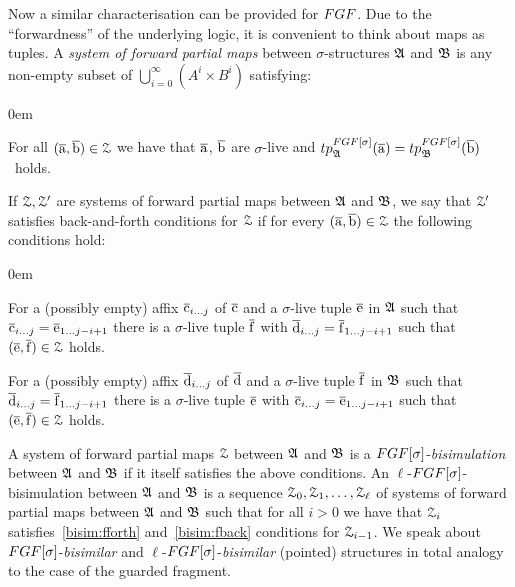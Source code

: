 Now a similar characterisation can be provided for $\FGF$. 
Due to the ``forwardness'' of the underlying logic, it is convenient to think about maps as tuples.
A \emph{system of forward partial maps} between $\sigma$-structures ${\mathfrak{A}}$ and ${\mathfrak{B}}$ is any non-empty subset of $\bigcup_{i=0}^{\infty} (A^i \times B^i)$ satisfying:
\begin{description}\itemsep0em
  \item[\desclabel{(AtomicEq)}{bisim:atomiceq}] For all $(\overline{\mathrm{a}}, \overline{\mathrm{b}}) \in \mathcal{Z}$ we have that $\overline{\mathrm{a}}$, $\overline{\mathrm{b}}$ are $\sigma$-live and $\tp{\FGF[\sigma]}{\str{A}}{\elemtuplea} = \tp{\FGF[\sigma]}{\str{B}}{\elemtupleb}$~holds.
\end{description}
If $\mathcal{Z}, \mathcal{Z}'$ are systems of forward partial maps between ${\mathfrak{A}}$ and ${\mathfrak{B}}$, we say that $\mathcal{Z}'$ satisfies back-and-forth conditions for $\mathcal{Z}$ if for every $(\overline{\mathrm{a}}, \overline{\mathrm{b}}) \in \mathcal{Z}$ the following conditions hold:
\begin{description}\itemsep0em
  \item[\desclabel{(fForth)}{bisim:fforth}] For a (possibly empty) affix $\overline{\mathrm{c}}_{i\ldots j}$ of $\overline{\mathrm{c}}$ and a $\sigma$-live tuple $\overline{\mathrm{e}}$ in ${\mathfrak{A}}$ such that $\overline{\mathrm{c}}_{i\ldots j} = \overline{\mathrm{e}}_{1\ldots j{-}i{+}1}$ there is a $\sigma$-live tuple $\overline{\mathrm{f}}$ with $\overline{\mathrm{d}}_{i\ldots j} = {\overline{\mathrm{f}}}_{1\dots j{-}i{+}1}$ such that $(\overline{\mathrm{e}}, \overline{\mathrm{f}}) \in \mathcal{Z}$ holds.
  \item[\desclabel{(fBack)}{bisim:fback}] For a (possibly empty) affix $\overline{\mathrm{d}}_{i\ldots j}$ of $\overline{\mathrm{d}}$ and a $\sigma$-live tuple $\overline{\mathrm{f}}$ in ${\mathfrak{B}}$ such that $\overline{\mathrm{d}}_{i\ldots j} = {\overline{\mathrm{f}}}_{1\dots j{-}i{+}1}$ there is a $\sigma$-live tuple $\overline{\mathrm{e}}$ with $\overline{\mathrm{c}}_{i\ldots j} = \overline{\mathrm{e}}_{1\ldots j{-}i{+}1}$ such that $(\overline{\mathrm{e}}, \overline{\mathrm{f}}) \in \mathcal{Z}$ holds.
\end{description}
A system of forward partial maps $\mathcal{Z}$ between ${\mathfrak{A}}$ and ${\mathfrak{B}}$ is a $\FGF[\sigma]$-\emph{bisimulation} between ${\mathfrak{A}}$ and ${\mathfrak{B}}$ if it itself satisfies the above conditions. 
An $\ell$-$\FGF[\sigma]$-bisimulation between ${\mathfrak{A}}$ and ${\mathfrak{B}}$ is a sequence $\mathcal{Z}_0, \mathcal{Z}_1, \ldots, \mathcal{Z}_\ell$ of systems of forward partial maps between ${\mathfrak{A}}$ and ${\mathfrak{B}}$ such that for all $i > 0$ we have that $\mathcal{Z}_i$ satisfies~\ref{bisim:fforth} and~\ref{bisim:fback} conditions for $\mathcal{Z}_{i{-}1}$.
We speak about $\FGF[\sigma]$-\emph{bisimilar} and $\ell$-$\FGF[\sigma]$-\emph{bisimilar} (pointed) structures in total analogy to the case of the guarded fragment.
